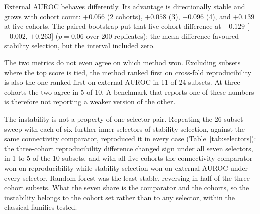 \documentclass[pdflatex,sn-vancouver-num]{sn-jnl}
\theoremstyle{thmstyleone}
\theoremstyle{thmstyletwo}
\theoremstyle{thmstylethree}
\begin{document}
External AUROC behaves differently. Its advantage is directionally stable and grows with cohort
count: $+0.056$ (2 cohorts), $+0.058$ (3), $+0.096$ (4), and $+0.139$ at five cohorts. The
paired bootstrap put that five-cohort difference at $+0.129$ [$-0.002$, $+0.263$] ($p = 0.06$ over
200 replicates): the mean difference favoured stability selection, but the interval included zero.

The two metrics do not even agree on which method won. Excluding subsets where the top score is
tied, the method ranked first on cross-fold reproducibility is also the one ranked first on
external AUROC in 11 of 24 subsets. At three cohorts the two agree in 5 of 10. A benchmark
that reports one of these numbers is therefore not reporting a weaker version of the other.

The instability is not a property of one selector pair. Repeating the 26-subset sweep with each
of six further inner selectors of stability selection, against the same connectivity comparator,
reproduced it in every case (Table~\ref{tab:selectors}): the three-cohort reproducibility
difference changed sign under all seven selectors, in 1 to 5 of the 10 subsets, and with all five
cohorts the connectivity comparator won on reproducibility while stability selection won on
external AUROC under every selector. Random forest was the least stable, reversing in half of the
three-cohort subsets. What the seven share is the comparator and the cohorts, so the instability
belongs to the cohort set rather than to any selector, within the classical families tested.
\end{document}
